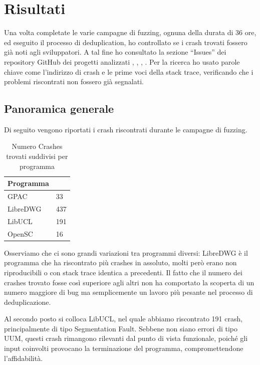 
\chapter{Risultati}

Una volta completate le varie campagne di fuzzing, ognuna della durata di 36 ore, ed eseguito il processo di deduplication, ho controllato se i crash trovati fossero già noti agli sviluppatori. A tal fine ho consultato la sezione ``Issues'' dei repository GitHub dei progetti analizzati \cite{ref25}, \cite{ref26}, \cite{ref27}, \cite{ref28}.  
Per la ricerca ho usato parole chiave come l'indirizzo di crash e le prime voci della stack trace, verificando che i problemi riscontrati non fossero già segnalati.

\section{Panoramica generale}

Di seguito vengono riportati i crash riscontrati durante le campagne di fuzzing.

\begin{table}[ht]
  \centering
  \caption{Numero Crashes trovati suddivisi per programma}
  \label{tab:recap-crashes}
  \begin{tabular}{ll}
    \toprule
    \textbf{Programma} & \textbf{} \\
    \midrule
    GPAC    & 33 \\
    LibreDWG & 437 \\
    LibUCL  & 191 \\
    OpenSC  & 16 \\
    \bottomrule
  \end{tabular}
\end{table}

Osserviamo che ci sono grandi variazioni tra programmi diversi: LibreDWG è il programma che ha riscontrato più crashes in assoluto, molti però erano non riproducibili o con stack trace identica a precedenti.
Il fatto che il numero dei crashes trovato fosse così superiore agli altri non ha comportato la scoperta di un numero maggiore di bug ma semplicemente un lavoro più pesante nel processo di deduplicazione. 

Al secondo posto si colloca LibUCL, nel quale abbiamo riscontrato 191 crash, principalmente di tipo Segmentation Fault. 
Sebbene non siano errori di tipo UUM, questi crash rimangono rilevanti dal punto di vista funzionale, poiché gli input coinvolti provocano la terminazione del programma, compromettendone l’affidabilità. 

